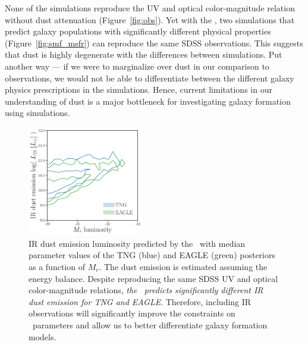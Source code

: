 None of the simulations reproduce the UV and optical color-magnitude relation
without dust attenuation (Figure~\ref{fig:obs}). 
Yet with the \eda, two simulations that predict galaxy populations with
significantly different physical properties (Figure~\ref{fig:smf_msfr}) can
reproduce the same SDSS observations. 
This suggests that dust is highly degenerate with the differences between simulations. 
Put another way --- if we were to marginalize over dust in our comparison to observations, we would not
be able to differentiate between the different galaxy physics prescriptions in
the simulations. 
Hence, current limitations in our understanding of dust is 
a major bottleneck for investigating galaxy formation using simulations.


\begin{figure}
\begin{center}
    \includegraphics[width=0.45\textwidth]{figs/abc_Lir.pdf}
    \caption{\label{fig:lir}
    IR dust emission luminosity predicted by the \eda~with median parameter
    values of the TNG (blue) and EAGLE (green) posteriors as a function of
    $M_r$. The dust emission is estimated assuming the \cite{dacunha2008}
    energy balance.  Despite reproducing the same SDSS UV and optical
    color-magnitude relations, \emph{the \eda~predicts significantly different
    IR dust emission for TNG and EAGLE}. Therefore, including IR
    observations will significantly improve the constraints on \eda~parameters
    and allow us to better differentiate galaxy formation models.
    }
\end{center}
\end{figure}

